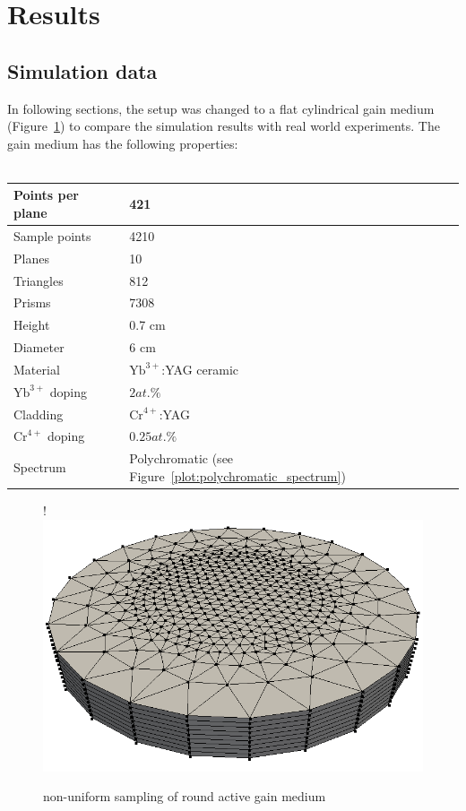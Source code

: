 \section{Results}

\subsection{Simulation data}
In following sections, the setup was changed to a flat cylindrical gain medium 
(Figure~\ref{graphic:samples_round}) to compare the simulation
results with real world experiments. The gain medium has the following
properties:
\\
\\ 
\begin{tabular}{| l | l |}
\hline
Points per plane        & 421\\
\hline
Sample points           & 4210\\
\hline
Planes                  & 10\\
\hline
Triangles               & 812\\
\hline
Prisms                  & 7308\\
\hline
Height                  & 0.7 cm\\
\hline
Diameter                & 6 cm\\
\hline
Material                & $\text{Yb}^{3+}$:YAG ceramic\\
\hline
$\text{Yb}^{3+}$ doping & $2at.\%$\\
\hline
Cladding                & $\text{Cr}^{4+}$:YAG\\
\hline
$\text{Cr}^{4+}$ doping & $0.25at.\%$\\
\hline
Spectrum                & Polychromatic (see Figure~\ref{plot:polychromatic_spectrum})\\
\hline
\end{tabular}

\begin{figure}[H]
  \centerline{
     {!} {\includegraphics{graphics/samples_round.png}}
  }
  \caption{non-uniform sampling of round active gain medium}
\label{graphic:samples_round}
\end{figure}

